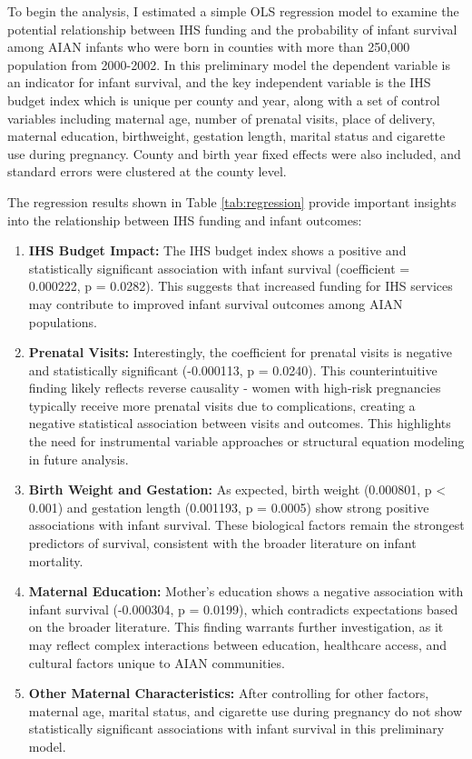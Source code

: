 \documentclass[12pt]{article}
\begin{document}
To begin the analysis, I estimated a simple OLS regression model to examine the potential relationship between IHS funding and the probability of infant survival among AIAN infants who were born in counties with more than 250,000 population from 2000-2002. In this preliminary model the dependent variable is an indicator for infant survival, and the key independent variable is the IHS budget index which is unique per county and year, along with a set of control variables including maternal age, number of prenatal visits, place of delivery, maternal education, birthweight, gestation length, marital status and cigarette use during pregnancy. County and birth year fixed effects were also included, and standard errors were clustered at the county level.

The regression results shown in Table \ref{tab:regression} provide important insights into the relationship between IHS funding and infant outcomes:

\begin{enumerate}
    \item \textbf{IHS Budget Impact:} The IHS budget index shows a positive and statistically significant association with infant survival (coefficient = 0.000222, p = 0.0282). This suggests that increased funding for IHS services may contribute to improved infant survival outcomes among AIAN populations.

    \item \textbf{Prenatal Visits:} Interestingly, the coefficient for prenatal visits is negative and statistically significant (-0.000113, p = 0.0240). This counterintuitive finding likely reflects reverse causality - women with high-risk pregnancies typically receive more prenatal visits due to complications, creating a negative statistical association between visits and outcomes. This highlights the need for instrumental variable approaches or structural equation modeling in future analysis.

    \item \textbf{Birth Weight and Gestation:} As expected, birth weight (0.000801, p < 0.001) and gestation length (0.001193, p = 0.0005) show strong positive associations with infant survival. These biological factors remain the strongest predictors of survival, consistent with the broader literature on infant mortality.

    \item \textbf{Maternal Education:} Mother's education shows a negative association with infant survival (-0.000304, p = 0.0199), which contradicts expectations based on the broader literature. This finding warrants further investigation, as it may reflect complex interactions between education, healthcare access, and cultural factors unique to AIAN communities.

    \item \textbf{Other Maternal Characteristics:} After controlling for other factors, maternal age, marital status, and cigarette use during pregnancy do not show statistically significant associations with infant survival in this preliminary model.
\end{enumerate}
\end{document}
